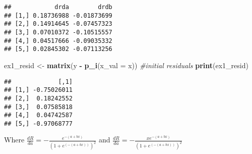 \documentclass[
]{article}
\newenvironment{Shaded}{\begin{snugshade}}{\end{snugshade}}
\newcommand{\CommentTok}[1]{\textcolor[rgb]{0.56,0.35,0.01}{\textit{#1}}}
\newcommand{\DataTypeTok}[1]{\textcolor[rgb]{0.13,0.29,0.53}{#1}}
\newcommand{\KeywordTok}[1]{\textcolor[rgb]{0.13,0.29,0.53}{\textbf{#1}}}
\newcommand{\NormalTok}[1]{#1}
\newcommand{\OperatorTok}[1]{\textcolor[rgb]{0.81,0.36,0.00}{\textbf{#1}}}
\newcommand{\StringTok}[1]{\textcolor[rgb]{0.31,0.60,0.02}{#1}}
\begin{document}
\begin{verbatim}
##            drda        drdb
## [1,] 0.18736988 -0.01873699
## [2,] 0.14914645 -0.07457323
## [3,] 0.07010372 -0.10515557
## [4,] 0.04517666 -0.09035332
## [5,] 0.02845302 -0.07113256
\end{verbatim}

\begin{Shaded}
\begin{Highlighting}[]
\NormalTok{ex1\_resid \textless{}{-}}\StringTok{ }\KeywordTok{matrix}\NormalTok{(y }\OperatorTok{{-}}\StringTok{ }\KeywordTok{p\_i}\NormalTok{(}\DataTypeTok{x\_val =}\NormalTok{ x)) }\CommentTok{\#initial residuals}
\KeywordTok{print}\NormalTok{(ex1\_resid)}
\end{Highlighting}
\end{Shaded}

\begin{verbatim}
##             [,1]
## [1,] -0.75026011
## [2,]  0.18242552
## [3,]  0.07585818
## [4,]  0.04742587
## [5,] -0.97068777
\end{verbatim}

Where \(\frac{dR}{da} = -\frac{e^{-(a+bx)}}{(1+e^(-(a+bx)))^2}\) and
\(\frac{dR}{da} = -\frac{xe^{-(a+bx)}}{(1+e^(-(a+bx)))^2}\)
\end{document}
